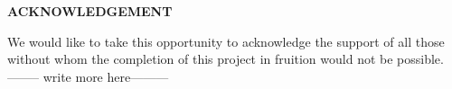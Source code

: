 \thispagestyle{plain}
\begin{center}
\large \large \textbf{ACKNOWLEDGEMENT}
\end{center}

\vspace{0.3cm}
\noindent
\fontsize{12pt}{24pt}\selectfont We would like to take this opportunity to acknowledge the support of all those without whom the completion of this project in fruition would not be possible.\\
-------- write more here---------








\newpage